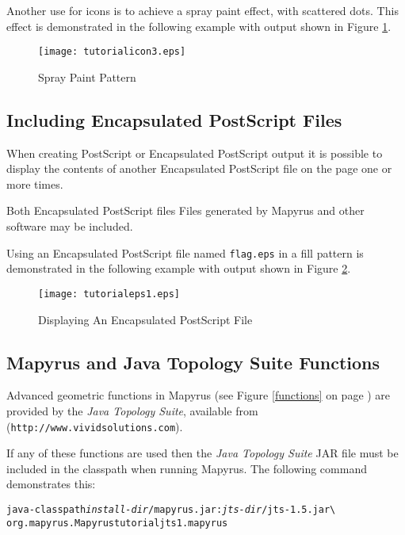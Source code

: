 Another use for icons is to achieve a spray paint effect,
with scattered dots.
This effect is demonstrated in the following example
with output shown in Figure \ref{tutorialicon3}.



\begin{figure}[htb]
\texttt{[image: tutorialicon3.eps]}
\caption{Spray Paint Pattern}
\label{tutorialicon3}
\end{figure}

\subsection{Including Encapsulated PostScript Files}

When creating PostScript or Encapsulated PostScript output it 
is possible to display the contents of another Encapsulated PostScript
file on the page one or more times.

Both Encapsulated PostScript files
Files generated by Mapyrus and other software may be included.

Using an Encapsulated PostScript file named \texttt{flag.eps}
in a fill pattern is demonstrated in the following example
with output shown in Figure \ref{tutorialeps1}.



\begin{figure}[htb]
\texttt{[image: tutorialeps1.eps]}
\caption{Displaying An Encapsulated PostScript File}
\label{tutorialeps1}
\end{figure}

\subsection{Mapyrus and Java Topology Suite Functions}
\label{tutorialjts}

Advanced geometric functions in Mapyrus
(see Figure \ref{functions} on page \pageref{functions})
are provided by the
\textit{Java Topology Suite},
available from
(\texttt{http://www.vividsolutions.com}).

If any of these functions are used then the
\textit{Java Topology Suite} JAR file must be included in the
classpath when running Mapyrus.  The following command demonstrates this:

\begin{alltt}
java -classpath \textit{install-dir}/mapyrus.jar:\textit{jts-dir}/jts-1.5.jar \textbackslash
  org.mapyrus.Mapyrus tutorialjts1.mapyrus
\end{alltt}

